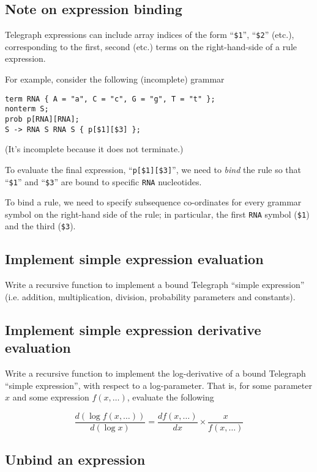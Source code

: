 \documentclass{article}
\begin{document}
\subsection{Note on expression binding}

Telegraph expressions can include array indices of the form
``{\tt \$1}'', ``{\tt \$2}'' (etc.), corresponding to the first, second (etc.)
terms on the right-hand-side of a rule expression.

For example, consider the following (incomplete) grammar

\begin{verbatim}
term RNA { A = "a", C = "c", G = "g", T = "t" };
nonterm S;
prob p[RNA][RNA];
S -> RNA S RNA S { p[$1][$3] };
\end{verbatim}

(It's incomplete because it does not terminate.)

To evaluate the final expression, ``{\tt p[\$1][\$3]}'',
we need to {\em bind} the rule so that ``{\tt \$1}'' and ``{\tt \$3}''
are bound to specific {\tt RNA} nucleotides.

To bind a rule, we need to specify subsequence co-ordinates for
every grammar symbol on the right-hand side of the rule; in particular,
the first {\tt RNA} symbol ({\tt \$1}) and the third ({\tt \$3}).

\subsection{Implement simple expression evaluation}

Write a recursive function to implement a bound Telegraph ``simple expression''
(i.e. addition, multiplication, division, probability parameters
and constants).

\subsection{Implement simple expression derivative evaluation}

Write a recursive function to implement the log-derivative of a bound
Telegraph ``simple expression'', with respect to a log-parameter.
That is, for some parameter $x$ and some expression $f(x,\ldots)$,
evaluate the following

\[
\frac{d \left( \log f(x,\ldots) \right)}{d (\log x)}
= \frac{d f(x,\ldots)}{dx} \times \frac{x}{f(x,\ldots)}
\]

\subsection{Unbind an expression}
\end{document}
